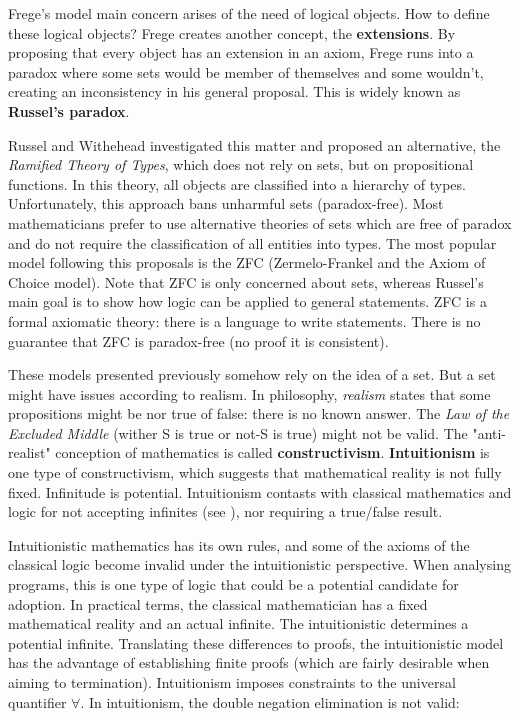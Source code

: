 Frege's model main concern arises of the need of logical objects. How to define these logical objects? Frege creates another concept, the \textbf{extensions}. By proposing that every object has an extension in an axiom, Frege runs into a paradox where some sets would be member of themselves and some wouldn't, creating an inconsistency in his general proposal. This is widely known as \textbf{Russel's paradox}. 

Russel and Withehead investigated this matter and proposed an alternative, the \textit{Ramified Theory of Types}, which does not rely on sets, but on propositional functions. In this theory, all objects are classified into a hierarchy of types. Unfortunately, this approach bans unharmful sets (paradox-free). Most mathematicians prefer to use alternative theories of sets which are free of paradox and do not require the classification of all entities into types. The most popular model following this proposals is the ZFC (Zermelo-Frankel and the Axiom of Choice model). Note that ZFC is only concerned about sets, whereas Russel's main goal is to show how logic can be applied to general statements. ZFC is a formal axiomatic theory: there is a language to write statements. There is no guarantee that ZFC is paradox-free (no proof it is consistent).

These models presented previously somehow rely on the idea of a set. But a set might have issues according to realism. In philosophy, \textit{realism} states that some propositions might be nor true of false: there is no known answer. The \textit{Law of the Excluded Middle} (wither S is true or not-S is true) might not be valid. The "anti-realist" conception of mathematics is called \textbf{constructivism}. \textbf{Intuitionism} is one type of constructivism, which suggests that mathematical reality is not fully fixed. Infinitude is potential. Intuitionism contasts with classical mathematics and logic for not accepting infinites (see \cite{weyl2013levels}), nor requiring a true/false result.

Intuitionistic mathematics has its own rules, and some of the axioms of the classical logic become invalid under the intuitionistic perspective. When analysing programs, this is one type of logic that could be a potential candidate for adoption. In practical terms, the classical mathematician has a fixed mathematical reality and an actual infinite. The intuitionistic determines a potential infinite. Translating these differences to proofs, the intuitionistic model has the advantage of establishing finite proofs (which are fairly desirable when aiming to termination). Intuitionism imposes constraints to the universal quantifier $ \forall $. In intuitionism, the double negation elimination is not valid:

